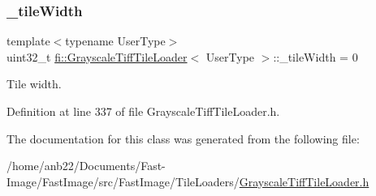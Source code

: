 \subsubsection{\texorpdfstring{\+\_\+tile\+Width}{\_tileWidth}}
{\footnotesize\ttfamily template$<$typename User\+Type$>$ \\
uint32\+\_\+t \hyperlink{classfi_1_1GrayscaleTiffTileLoader}{fi\+::\+Grayscale\+Tiff\+Tile\+Loader}$<$ User\+Type $>$\+::\+\_\+tile\+Width = 0\hspace{0.3cm}{\ttfamily [private]}}



Tile width. 



Definition at line 337 of file Grayscale\+Tiff\+Tile\+Loader.\+h.



The documentation for this class was generated from the following file\+:\begin{DoxyCompactItemize}
\item 
/home/anb22/\+Documents/\+Fast-\/\+Image/\+Fast\+Image/src/\+Fast\+Image/\+Tile\+Loaders/\hyperlink{GrayscaleTiffTileLoader_8h}{Grayscale\+Tiff\+Tile\+Loader.\+h}\end{DoxyCompactItemize}
